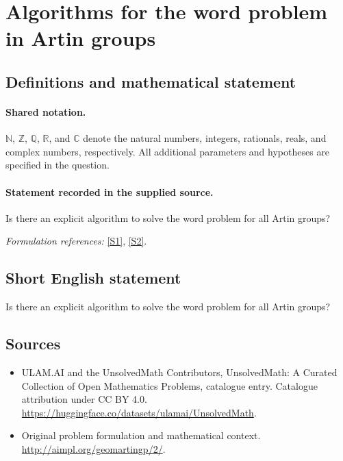 \documentclass[11pt]{article}
\newcommand{\sref}[2]{\hyperlink{source:#1:#2}{[S#2]}}
\begin{document}
\section{Algorithms for the word problem in Artin groups}\label{statement}

\subsection{Definitions and mathematical statement}

\paragraph{Shared notation.}$\mathbb N$, $\mathbb Z$, $\mathbb Q$, $\mathbb R$, and $\mathbb C$ denote the natural numbers, integers, rationals, reals, and complex numbers, respectively. All additional parameters and hypotheses are specified in the question.


\paragraph{Statement recorded in the supplied source.}
Is there an explicit algorithm to solve the word problem for all Artin groups?
\par\smallskip\textit{Formulation references:} \sref{statement}{1}, \sref{statement}{2}.
\subsection{Short English statement}
Is there an explicit algorithm to solve the word problem for all Artin groups?
\subsection{Sources}
\begin{itemize}
\item[\hypertarget{source:statement:1}{S1}] ULAM.AI and the UnsolvedMath Contributors, UnsolvedMath: A Curated Collection of Open Mathematics Problems, catalogue entry. Catalogue attribution under CC BY 4.0.
\url{https://huggingface.co/datasets/ulamai/UnsolvedMath}.
\item[\hypertarget{source:statement:2}{S2}] Original problem formulation and mathematical context.
\url{http://aimpl.org/geomartingp/2/}.
\end{itemize}
\label{end:statement}
\end{document}
